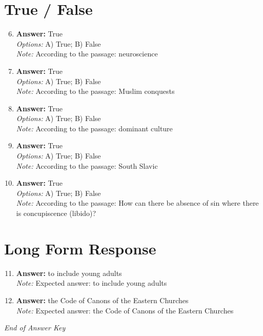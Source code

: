 \documentclass[12pt]{article}
\begin{document}
\section*{True / False}
\begin{enumerate}[label=\arabic*.]
\setcounter{enumi}{5}
\item \textbf{Answer:} True
\\ \textit{Options:} A) True; B) False
\\ \textit{Note:} According to the passage: neuroscience
\item \textbf{Answer:} True
\\ \textit{Options:} A) True; B) False
\\ \textit{Note:} According to the passage: Muslim conquests
\item \textbf{Answer:} True
\\ \textit{Options:} A) True; B) False
\\ \textit{Note:} According to the passage: dominant culture
\item \textbf{Answer:} True
\\ \textit{Options:} A) True; B) False
\\ \textit{Note:} According to the passage: South Slavic
\item \textbf{Answer:} True
\\ \textit{Options:} A) True; B) False
\\ \textit{Note:} According to the passage: How can there be absence of sin where there is concupiscence (libido)?
\end{enumerate}

\section*{Long Form Response}
\begin{enumerate}[label=\arabic*.]
\setcounter{enumi}{10}
\item \textbf{Answer:} to include young adults
\\ \textit{Note:} Expected answer: to include young adults
\item \textbf{Answer:} the Code of Canons of the Eastern Churches
\\ \textit{Note:} Expected answer: the Code of Canons of the Eastern Churches
\end{enumerate}

\vfill
\noindent\textit{End of Answer Key}
\end{document}
